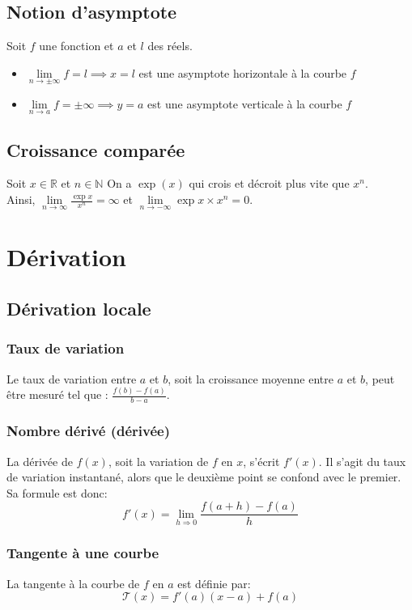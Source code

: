 \documentclass{article}
\begin{document}
\subsection{Notion d'asymptote}
Soit $f$ une fonction et $a$ et $l$ des réels.
\begin{itemize}
	\item $\lim \limits_{n \rightarrow \pm \infty} f = l \implies x=l$ est une asymptote horizontale à la courbe $f$
	\item $\lim \limits_{n \rightarrow a} f = \pm \infty \implies y=a$ est une asymptote verticale à la courbe $f$
\end{itemize}

\subsection{Croissance comparée}
Soit $x\in\mathbb{R}$ et $n\in\mathbb{N}$
On a $\exp(x)$ qui crois et décroit plus vite que $x^n$.\\
Ainsi, $\lim \limits_{n \rightarrow \infty} \frac{\exp{x}}{x^n} = \infty$ et $\lim \limits_{n \rightarrow -\infty} \exp{x}\times x^n = 0$.


\section{Dérivation}
\subsection{Dérivation locale}

\subsubsection{Taux de variation}
Le taux de variation entre $a$ et $b$, soit la croissance moyenne entre $a$ et $b$, peut être mesuré tel que : $\frac{f(b) - f(a)}{b - a}$.\\

\subsubsection{Nombre dérivé (dérivée)}
La dérivée de $f(x)$, soit la variation de $f$ en $x$, s'écrit $f'(x)$. Il s'agit du taux de variation instantané, alors que le deuxième point se confond avec le premier. Sa formule est donc:
$$f'(x) = \lim \limits_{h \Rightarrow 0} \frac{f(a + h) - f(a)}{h}$$

\subsubsection{Tangente à une courbe}
La tangente à la courbe de $f$ en $a$ est définie par: $$\mathcal{T}(x) = f'(a)(x-a) + f(a)$$
\end{document}
